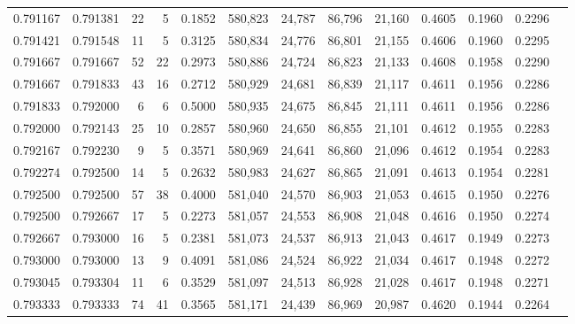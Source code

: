 \begin{tabular}{rrrrrrrrrrrrr}
0.791167 & 0.791381 &    22 &   5 &                                     0.1852 & 580,823 &  24,787 &  86,796 &  21,160 & 0.4605 & 0.1960 & 0.2296 \\
0.791421 & 0.791548 &    11 &   5 &                                     0.3125 & 580,834 &  24,776 &  86,801 &  21,155 & 0.4606 & 0.1960 & 0.2295 \\
0.791667 & 0.791667 &    52 &  22 &                                     0.2973 & 580,886 &  24,724 &  86,823 &  21,133 & 0.4608 & 0.1958 & 0.2290 \\
0.791667 & 0.791833 &    43 &  16 &                                     0.2712 & 580,929 &  24,681 &  86,839 &  21,117 & 0.4611 & 0.1956 & 0.2286 \\
0.791833 & 0.792000 &     6 &   6 &                                     0.5000 & 580,935 &  24,675 &  86,845 &  21,111 & 0.4611 & 0.1956 & 0.2286 \\
0.792000 & 0.792143 &    25 &  10 &                                     0.2857 & 580,960 &  24,650 &  86,855 &  21,101 & 0.4612 & 0.1955 & 0.2283 \\
0.792167 & 0.792230 &     9 &   5 &                                     0.3571 & 580,969 &  24,641 &  86,860 &  21,096 & 0.4612 & 0.1954 & 0.2283 \\
0.792274 & 0.792500 &    14 &   5 &                                     0.2632 & 580,983 &  24,627 &  86,865 &  21,091 & 0.4613 & 0.1954 & 0.2281 \\
0.792500 & 0.792500 &    57 &  38 &                                     0.4000 & 581,040 &  24,570 &  86,903 &  21,053 & 0.4615 & 0.1950 & 0.2276 \\
0.792500 & 0.792667 &    17 &   5 &                                     0.2273 & 581,057 &  24,553 &  86,908 &  21,048 & 0.4616 & 0.1950 & 0.2274 \\
0.792667 & 0.793000 &    16 &   5 &                                     0.2381 & 581,073 &  24,537 &  86,913 &  21,043 & 0.4617 & 0.1949 & 0.2273 \\
0.793000 & 0.793000 &    13 &   9 &                                     0.4091 & 581,086 &  24,524 &  86,922 &  21,034 & 0.4617 & 0.1948 & 0.2272 \\
0.793045 & 0.793304 &    11 &   6 &                                     0.3529 & 581,097 &  24,513 &  86,928 &  21,028 & 0.4617 & 0.1948 & 0.2271 \\
0.793333 & 0.793333 &    74 &  41 &                                     0.3565 & 581,171 &  24,439 &  86,969 &  20,987 & 0.4620 & 0.1944 & 0.2264 \\

\end{tabular}
